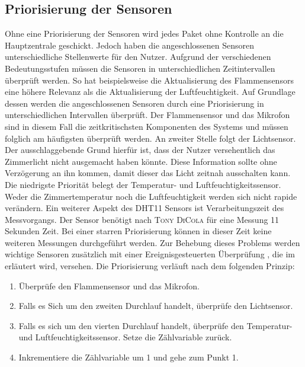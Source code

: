 \subsection{Priorisierung der Sensoren}
Ohne eine Priorisierung der Sensoren wird jedes Paket ohne Kontrolle an die Hauptzentrale geschickt. Jedoch haben die angeschlossenen Sensoren unterschiedliche Stellenwerte für den Nutzer. Aufgrund der verschiedenen Bedeutungsstufen müssen die Sensoren in unterschiedlichen Zeitintervallen überprüft werden. So hat beispielsweise die Aktualisierung des Flammensensors eine höhere Relevanz als die Aktualisierung der Luftfeuchtigkeit. Auf Grundlage dessen werden die angeschlossenen Sensoren durch eine Priorisierung in unterschiedlichen Intervallen überprüft. Der Flammensensor und das Mikrofon sind in diesem Fall die zeitkritischsten Komponenten des Systems und müssen folglich am häufigsten überprüft werden. An zweiter Stelle folgt der Lichtsensor. Der ausschlaggebende Grund hierfür ist, dass  der Nutzer versehentlich das Zimmerlicht nicht ausgemacht haben könnte. Diese Information sollte ohne Verzögerung an ihn kommen, damit dieser das Licht zeitnah ausschalten kann. Die niedrigste Priorität belegt der Temperatur- und Luftfeuchtigkeitssensor. Weder die Zimmertemperatur noch die Luftfeuchtigkeit werden sich nicht rapide verändern. Ein weiterer Aspekt des DHT11 Sensors ist Verarbeitungszeit des Messvorgangs. Der Sensor benötigt nach \textsc{Tony DiCola}\cite{Adafruit47:online} für eine Messung 11 Sekunden Zeit. Bei einer starren Priorisierung können in dieser Zeit keine weiteren Messungen durchgeführt werden. Zur Behebung dieses Problems werden wichtige Sensoren zusätzlich mit einer Ereignisgesteuerten Überprüfung , die im  erläutert wird, versehen. Die Priorisierung verläuft nach dem folgenden Prinzip:
\begin{enumerate}
	\item Überprüfe den Flammensensor und das Mikrofon.
	\item Falls es Sich um den zweiten Durchlauf handelt, überprüfe den Lichtsensor.
	\item  Falls es sich um den vierten Durchlauf handelt, überprüfe den Temperatur- und Luftfeuchtigkeitssensor. Setze die Zählvariable zurück.
	\item Inkrementiere die Zählvariable um 1 und gehe zum Punkt 1.
\end{enumerate}
